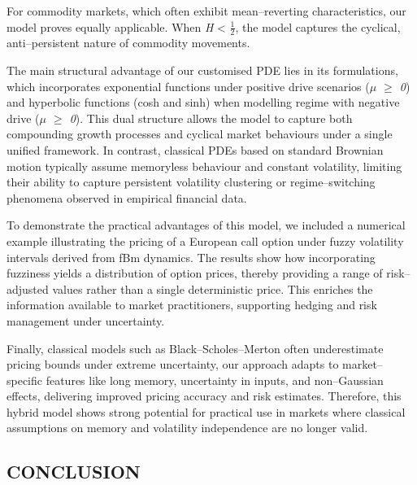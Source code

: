 \documentclass[12pt,a4paper]{report}
\numberwithin{equation}{section}
\begin{document}
For commodity markets, which often exhibit mean--reverting
characteristics, our model proves equally applicable. When \emph{H}
\textless{} $\frac{1}{2}$, the model captures the cyclical, anti--persistent nature
of commodity movements.

The main structural advantage of our customised PDE lies in its
formulations, which incorporates exponential functions under positive
drive scenarios (\emph{$\mu$ $\geq$ 0}) and hyperbolic functions (cosh and sinh)
when modelling regime with negative drive (\emph{$\mu$ $\geq$ 0}). This dual
structure allows the model to capture both compounding growth processes
and cyclical market behaviours under a single unified framework. In
contrast, classical PDEs based on standard Brownian motion typically
assume memoryless behaviour and constant volatility, limiting their
ability to capture persistent volatility clustering or regime--switching
phenomena observed in empirical financial data.

To demonstrate the practical advantages of this model, we included a
numerical example illustrating the pricing of a European call option
under fuzzy volatility intervals derived from fBm dynamics. The results
show how incorporating fuzziness yields a distribution of option prices,
thereby providing a range of risk--adjusted values rather than a single
deterministic price. This enriches the information available to market
practitioners, supporting hedging and risk management under uncertainty.

Finally, classical models such as Black--Scholes--Merton \cite{merton1976option_93} often
underestimate pricing bounds under extreme uncertainty, our approach
adapts to market--specific features like long memory, uncertainty in
inputs, and non--Gaussian effects, delivering improved pricing accuracy
and risk estimates. Therefore, this hybrid model shows strong potential
for practical use in markets where classical assumptions on memory and
volatility independence are no longer valid.

\hypertarget{conclusion--1}{%
\subsection{\texorpdfstring{CONCLUSION
}{CONCLUSION }}\label{conclusion--1}}
\end{document}
